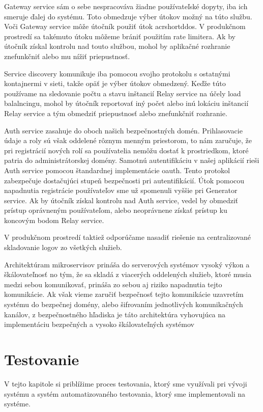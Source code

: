 Gateway service sám o sebe nespracováva žiadne používateľské dopyty, iba ich smeruje ďalej do systému. Toto obmedzuje výber útokov možný na túto službu. Voči Gateway service môže útočník použiť útok acrshort{ddos}. V produkčnom prostredí sa takémuto útoku môžeme brániť použitím rate limitera. Ak by útočník získal kontrolu nad touto službou, mohol by aplikačné rozhranie znefunkčniť alebo mu nížiť priepustnosť.

Service discovery komunikuje iba pomocou svojho protokolu s ostatnými kontajnermi v sieti, takže opäť je výber útokov obmedzený. Keďže túto používame na sledovanie počtu a stavu inštancií Relay service na účely load balalncingu, mohol by útočník reportovať iný počet alebo inú lokáciu inštancií Relay service a tým obmedziť priepustnosť alebo znefunkčniť rozhranie.

Auth service zasahuje do oboch našich bezpečnostných domén. Prihlasovacie údaje a roly sú však oddelené rôznym menným priestorom, to nám zaručuje, že pri registrácií nových rolí sa používatelia nemôžu dostať k prostriedkom, ktoré patria do administrátorskej domény. Samotnú
autentifikáciu v našej aplikácií rieši Auth service pomocou štandardnej implementácie \acrshort{oauth}. Tento protokol zabezpečuje dostačujúci stupeň bezpečnosti pri autentifikácií. Útok pomocou napadnutia registrácie používateľov sme už spomenuli vyššie pri Generator service. Ak by útočník získal kontrolu nad Auth service, vedel by obmedziť prístup oprávneným používateľom, alebo neoprávnene získať prístup ku koncovým bodom Relay service.

V produkčnom prostredí taktiež odporúčame nasadiť riešenie na centralizované skladovanie logov zo všetkých služieb.

Architektúram mikroservisov prináša do serverových systémov vysoký výkon a škálovateľnosť no tým, že sa skladá z viacerých oddelených služieb, ktoré musia medzi sebou komunikovať, prináša zo sebou aj riziko napadnutia tejto komunikácie. Ak však vieme zaručiť bezpečnosť tejto komunikácie uzavretím systému do bezpečnej domény, alebo šifrovaním jednotlivých komunikačných kanálov, z bezpečnostného hľadiska je táto architektúra vyhovujúca na  implementáciu bezpečných a vysoko škálovateľných systémov


\section{Testovanie}
V tejto kapitole si priblížime proces testovania, ktorý sme využívali pri vývoji systému a systém automatizovaného testovania, ktorý sme implementovali na systéme.

